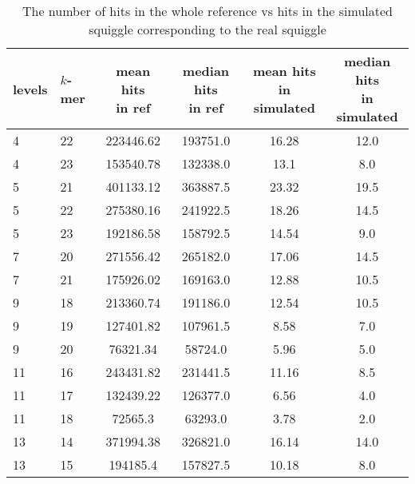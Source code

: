 \begin{table}
\caption[TODO]{The number of hits in the whole reference vs hits in the simulated
squiggle corresponding to the real squiggle}
\label{tab:hitsRefvsSimul}
\begin{center}
\begin{tabular}{|l|l|c|c|c|c|}
\hline
levels & $k$-mer & \specialcell{mean hits\\in ref} & \specialcell{median hits\\in ref} & \specialcell{mean hits\\in simulated} & \specialcell{median hits\\in simulated} \\
\hline
4 & 22 & 223446.62 & 193751.0 & 16.28 & 12.0 \\
\hline
4 & 23 & 153540.78 & 132338.0 & 13.1 & 8.0 \\
\hline
5 & 21 & 401133.12 & 363887.5 & 23.32 & 19.5 \\
\hline
5 & 22 & 275380.16 & 241922.5 & 18.26 & 14.5 \\
\hline
5 & 23 & 192186.58 & 158792.5 & 14.54 & 9.0 \\
\hline
7 & 20 & 271556.42 & 265182.0 & 17.06 & 14.5 \\
\hline
7 & 21 & 175926.02 & 169163.0 & 12.88 & 10.5 \\
\hline
9 & 18 & 213360.74 & 191186.0 & 12.54 & 10.5 \\
\hline
9 & 19 & 127401.82 & 107961.5 & 8.58 & 7.0 \\
\hline
9 & 20 & 76321.34 & 58724.0 & 5.96 & 5.0 \\
\hline
11 & 16 & 243431.82 & 231441.5 & 11.16 & 8.5 \\
\hline
11 & 17 & 132439.22 & 126377.0 & 6.56 & 4.0 \\
\hline
11 & 18 & 72565.3 & 63293.0 & 3.78 & 2.0 \\
\hline
13 & 14 & 371994.38 & 326821.0 & 16.14 & 14.0 \\
\hline
13 & 15 & 194185.4 & 157827.5 & 10.18 & 8.0 \\
\hline
\end{tabular}
\end{center}
\end{table}
